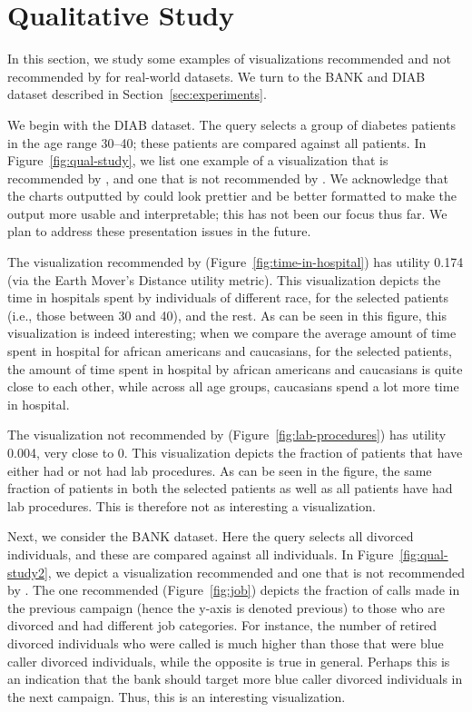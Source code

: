 
\section{Qualitative Study}\label{sec:example-viz}

In this section, we study some examples of visualizations recommended and
not recommended by \VizRecDB for real-world datasets.
We turn to the BANK and DIAB dataset described in 
Section~\ref{sec:experiments}.
 
We begin with the DIAB dataset. The query selects a group of diabetes patients in the age range 30--40;
these patients are compared against all patients.
In Figure~\ref{fig:qual-study}, we list one example of a visualization
that is recommended by \VizRecDB, and one that is not recommended by \VizRecDB.
We acknowledge that the charts outputted by \VizRecDB could look prettier and be better
formatted to make the output more usable and interpretable; this has not been our focus thus far. 
We plan to address these presentation issues in the future.

The visualization recommended by \VizRecDB (Figure~\ref{fig:time-in-hospital}) has utility 0.174 (via
the Earth Mover's Distance utility metric).
This visualization depicts the time in hospitals spent by
individuals of different race, for the selected patients
(i.e., those between 30 and 40), and
the rest. 
As can be seen in this figure, this visualization is indeed interesting;
when we compare the average amount of time spent in hospital 
for african americans and caucasians, 
for the selected patients, the amount of time spent in hospital
by african americans and caucasians is quite close to each other,
while across all age groups, caucasians spend a lot more time
in hospital.

The visualization not recommended by \VizRecDB (Figure~\ref{fig:lab-procedures}) has utility 0.004, very close to 0.
This visualization depicts the fraction of patients that 
have either had or not had lab procedures. 
As can be seen in the figure, the same fraction of patients in
both the selected patients as well as all patients
have had lab procedures.
This is therefore not as interesting a visualization.

Next, we consider the BANK dataset. 
Here the query selects all divorced individuals, 
and these are compared against all individuals. 
In Figure~\ref{fig:qual-study2}, we depict
a visualization recommended and one that is not recommended by \VizRecDB.
The one recommended (Figure~\ref{fig:job}) depicts the fraction of calls made in the previous campaign (hence the y-axis is denoted previous) to those
who are divorced and had different job categories.
For instance, the number of retired divorced individuals who were called
is much higher than those that were blue caller divorced individuals,
while the opposite is true in general.
Perhaps this is an indication that the bank should target more blue caller divorced
individuals in the next campaign.
Thus, this is an interesting visualization.

